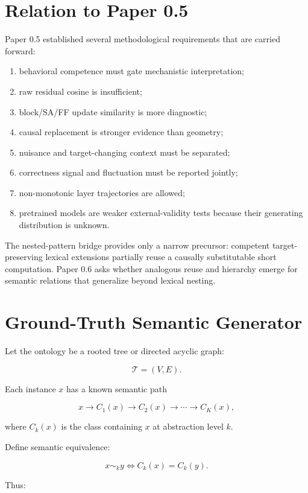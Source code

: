 \documentclass[10pt]{article}
\begin{document}
\section{Relation to Paper 0.5}

Paper 0.5 established several methodological requirements that are carried forward:

\begin{enumerate}
\item behavioral competence must gate mechanistic interpretation;
\item raw residual cosine is insufficient;
\item block/SA/FF update similarity is more diagnostic;
\item causal replacement is stronger evidence than geometry;
\item nuisance and target-changing context must be separated;
\item correctness signal and fluctuation must be reported jointly;
\item non-monotonic layer trajectories are allowed;
\item pretrained models are weaker external-validity tests because their generating distribution is unknown.
\end{enumerate}

The nested-pattern bridge provides only a narrow precursor: competent target-preserving lexical extensions partially reuse a causally substitutable short computation. Paper 0.6 asks whether analogous reuse and hierarchy emerge for semantic relations that generalize beyond lexical nesting.

\section{Ground-Truth Semantic Generator}

Let the ontology be a rooted tree or directed acyclic graph:

\[
\mathcal{T}=(V,E).
\]

Each instance \(x\) has a known semantic path

\[
x \rightarrow C_1(x) \rightarrow C_2(x) \rightarrow \cdots \rightarrow C_K(x),
\]

where \(C_k(x)\) is the class containing \(x\) at abstraction level \(k\).

Define semantic equivalence:

\[
x \sim_k y
\iff
C_k(x)=C_k(y).
\]

Thus:
\end{document}
